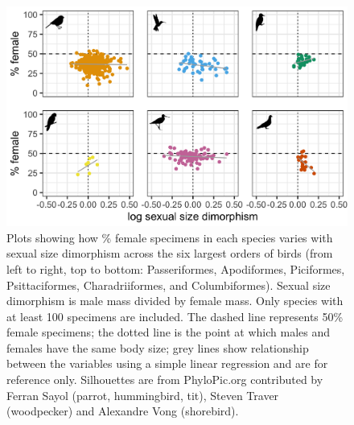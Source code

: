 \documentclass[a4paper, 12pt]{article}
\begin{document}
\begin{figure}
 \centering
  \includegraphics[width = \linewidth]{figures/ssd-orders-birds.png}
  \caption{Plots showing how \% female specimens in each species varies with sexual size dimorphism across the six largest orders of birds (from left to right, top to bottom: Passeriformes, Apodiformes, Piciformes, Psittaciformes, Charadriiformes, and Columbiformes).
  Sexual size dimorphism is male mass divided by female mass. 
  Only species with at least 100 specimens are included. 
  The dashed line represents 50\% female specimens; the dotted line is the point at which males and females have the same body size; grey lines show relationship between the variables using a simple linear regression and are for reference only. 
  Silhouettes are from PhyloPic.org contributed by Ferran Sayol (parrot, hummingbird, tit), Steven Traver (woodpecker) and Alexandre Vong (shorebird).}
  \label{fig-bird-ssd}
\end{figure}
\end{document}
